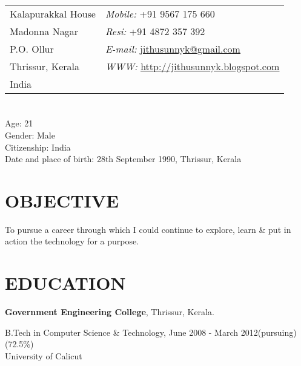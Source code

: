 \begin{resume}


\section{}
\vspace{.05in}
\begin{tabular}{@{}p{2in}p{4in}}
Kalapurakkal House   & {\it Mobile:}  +91 9567 175 660 \\
Madonna Nagar   & {\it Resi:}    +91 4872 357 392   \\
P.O. Ollur & {\it E-mail:}
\href{mailto:jithusunnyk@gmail.com}{\underline{jithusunnyk@gmail.com}}
\\
Thrissur, Kerala  & {\it WWW:}
\href{http://jithusunnyk.blogspot.com}{\underline{http://jithusunnyk.blogspot.com}}
 \\
India
\end{tabular}

\vspace*{+2mm}
\section{}
Age: 21\\
Gender: Male\\
Citizenship: India\\
Date and place of birth: 28th September 1990, Thrissur, Kerala \\

\vspace*{+2mm}

\section{\bf \textsf{OBJECTIVE}}
To pursue a career through which I could continue to explore, learn \& put in action the technology for a purpose.

\vspace*{+2mm}

\section{\bf \textsf{EDUCATION}}
{\bf \textsf{Government Engineering College}}, Thrissur, Kerala.\\
\vspace*{-.1in}

\begin{list1}
\item[] B.Tech in Computer Science \& Technology, June 2008 - March 2012(pursuing)  \qquad (72.5\%)\\ University of Calicut 
\end{list1}


\end{resume}
